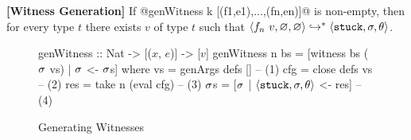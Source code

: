 \begin{cor}{\textbf{[Witness Generation]}}
\label{thm:generation}
  If @genWitness k [(f1,e1),...,(fn,en)]@ is non-empty,
  then for every type $t$ there exists $v$ of type $t$ such that
  $\langle f_n\ v, \varnothing, \varnothing \rangle \hookrightarrow^{*} \langle \mathtt{stuck}, \sigma, \theta \rangle$.
\end{cor}

\begin{figure}[t]
\centering
\begin{mcode}
genWitness :: Nat -> [($x$, $e$)] -> [$v$]
genWitness n bs
       = [witness bs ($\sigma$ vs) | $\sigma$ <- $\sigma$s]
  where
   vs  = genArgs defs []        -- (1)
   cfg = close defs vs          -- (2)
   res = take n (eval cfg)      -- (3)
   $\sigma$s   = [$\sigma$ | $\langle \mathtt{stuck}, \sigma, \theta \rangle$ <- res]  -- (4)
\end{mcode}
\caption{Generating Witnesses}
\label{fig:algo-gen-witness}
\end{figure}


